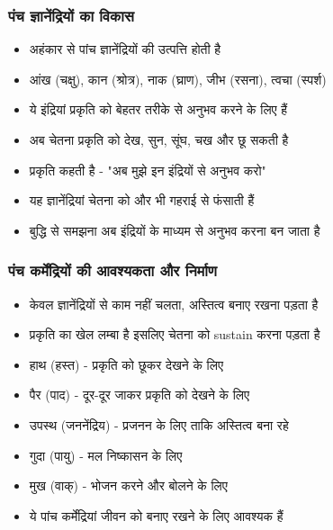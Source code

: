 \begin{frame}[fragile]\frametitle{पंच ज्ञानेंद्रियों का विकास}
      \begin{itemize}
          \item अहंकार से पांच ज्ञानेंद्रियों की उत्पत्ति होती है
          \item आंख (चक्षु), कान (श्रोत्र), नाक (घ्राण), जीभ (रसना), त्वचा (स्पर्श)
          \item ये इंद्रियां प्रकृति को बेहतर तरीके से अनुभव करने के लिए हैं
          \item अब चेतना प्रकृति को देख, सुन, सूंघ, चख और छू सकती है
          \item प्रकृति कहती है - "अब मुझे इन इंद्रियों से अनुभव करो"
          \item यह ज्ञानेंद्रियां चेतना को और भी गहराई से फंसाती हैं
          \item बुद्धि से समझना अब इंद्रियों के माध्यम से अनुभव करना बन जाता है
      \end{itemize}
\end{frame}

\begin{frame}[fragile]\frametitle{पंच कर्मेंद्रियों की आवश्यकता और निर्माण}
      \begin{itemize}
          \item केवल ज्ञानेंद्रियों से काम नहीं चलता, अस्तित्व बनाए रखना पड़ता है
          \item प्रकृति का खेल लम्बा है इसलिए चेतना को sustain करना पड़ता है
          \item हाथ (हस्त) - प्रकृति को छूकर देखने के लिए
          \item पैर (पाद) - दूर-दूर जाकर प्रकृति को देखने के लिए
          \item उपस्थ (जननेंद्रिय) - प्रजनन के लिए ताकि अस्तित्व बना रहे
          \item गुदा (पायु) - मल निष्कासन के लिए
          \item मुख (वाक्) - भोजन करने और बोलने के लिए
          \item ये पांच कर्मेंद्रियां जीवन को बनाए रखने के लिए आवश्यक हैं
      \end{itemize}
\end{frame}

